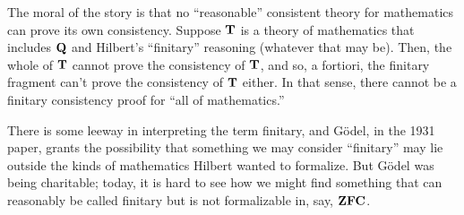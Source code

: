 \documentclass[../../../include/open-logic-section]{subfiles}
\begin{document}
\begin{digress}
The moral of the story is that no ``reasonable'' consistent theory for
mathematics can prove its own consistency. Suppose $\mathbf{T}$ is a
theory of mathematics that includes $\mathbf{Q}$ and Hilbert's
``finitary'' reasoning (whatever that may be). Then, the whole of
$\mathbf{T}$ cannot prove the consistency of $\mathbf{T}$, and so, a fortiori,
the finitary fragment can't prove the consistency of $\mathbf{T}$
either. In that sense, there cannot be a finitary consistency proof
for ``all of mathematics.''

There is some leeway in interpreting the term finitary, and G\"odel, in
the 1931 paper, grants the possibility that something we may consider
``finitary'' may lie outside the kinds of mathematics Hilbert wanted
to formalize. But G\"odel was being charitable; today, it is hard to
see how we might find something that can reasonably be called finitary
but is not formalizable in, say, $\mathbf{ZFC}$.
\end{digress}
\end{document}
